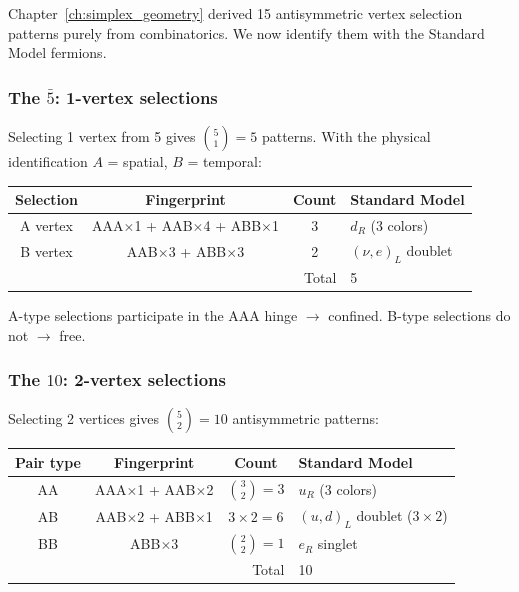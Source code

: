 \documentclass[12pt]{article}
\theoremstyle{remark}
\theoremstyle{definition}
\begin{document}
Chapter~\ref{ch:simplex_geometry} derived 15 antisymmetric vertex selection patterns purely from combinatorics. We now identify them with the Standard Model fermions.

\subsubsection{The $\bar{5}$: 1-vertex selections}

Selecting 1 vertex from 5 gives $\binom{5}{1} = 5$ patterns. With the physical identification $A$ = spatial, $B$ = temporal:

\begin{center}
\begin{tabular}{cccl}
\hline
Selection & Fingerprint & Count & Standard Model \\
\hline
A vertex & AAA$\times$1 + AAB$\times$4 + ABB$\times$1 & 3 & $d_R$ (3 colors) \\
B vertex & AAB$\times$3 + ABB$\times$3 & 2 & $(\nu, e)_L$ doublet \\
\hline
\multicolumn{3}{r}{Total} & 5 \\
\hline
\end{tabular}
\end{center}

A-type selections participate in the AAA hinge $\to$ confined. B-type selections do not $\to$ free.

\subsubsection{The $10$: 2-vertex selections}

Selecting 2 vertices gives $\binom{5}{2} = 10$ antisymmetric patterns:

\begin{center}
\begin{tabular}{cccl}
\hline
Pair type & Fingerprint & Count & Standard Model \\
\hline
AA & AAA$\times$1 + AAB$\times$2 & $\binom{3}{2} = 3$ & $u_R$ (3 colors) \\
AB & AAB$\times$2 + ABB$\times$1 & $3 \times 2 = 6$ & $(u, d)_L$ doublet ($3 \times 2$) \\
BB & ABB$\times$3 & $\binom{2}{2} = 1$ & $e_R$ singlet \\
\hline
\multicolumn{3}{r}{Total} & 10 \\
\hline
\end{tabular}
\end{center}
\end{document}
